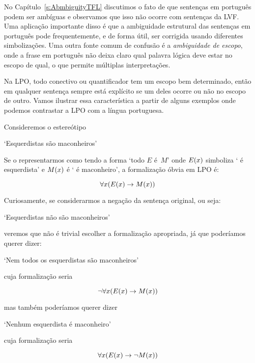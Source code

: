 No Capítulo~\ref{s:AbmbiguityTFL} discutimos o fato de que sentenças em português podem ser ambíguas e observamos que isso não ocorre com sentenças da LVF. Uma aplicação importante disso é que a ambiguidade estrutural das sentenças em português pode frequentemente, e de forma útil, ser corrigida usando diferentes simbolizações. Uma outra fonte comum de confusão é a \emph{ambiguidade de escopo}, onde a frase em português não deixa claro qual palavra lógica deve estar no escopo de qual, o que permite múltiplas interpretações.

Na LPO, todo conectivo ou quantificador tem um escopo bem determinado, então em qualquer sentença sempre está explícito se um deles ocorre ou não no escopo de outro. Vamos ilustrar essa característica a partir de alguns exemplos onde podemos contrastar a LPO com a língua portuguesa.

Consideremos o estereótipo

\begin{center}
`Esquerdistas são maconheiros'
\end{center}

Se o representarmos como tendo a forma `todo $E$ é~$M$' onde $\mathord{E}(x)$ simboliza ` é esquerdista' e $\mathord{M}(x)$ é ` é maconheiro', a formalização óbvia em LPO é:

$$\forall x (\mathord{E}(x) \rightarrow \mathord{M}(x))$$

Curiosamente, se considerarmos a negação da sentença original, ou seja:

\begin{center}
`Esquerdistas não são maconheiros'
\end{center}

\noindent
veremos que não é trivial escolher a formalização apropriada, já que poderíamos querer dizer:

\begin{center}
 `Nem todos os esquerdistas são maconheiros'
\end{center}

cuja formalização seria

$$\neg \forall x (\mathord{E}(x) \rightarrow \mathord{M}(x))$$

mas também poderíamos querer dizer

\begin{center}
 `Nenhum esquerdista é maconheiro'
\end{center}

cuja formalização seria

$$\forall x (\mathord{E}(x) \rightarrow \neg \mathord{M}(x))$$

